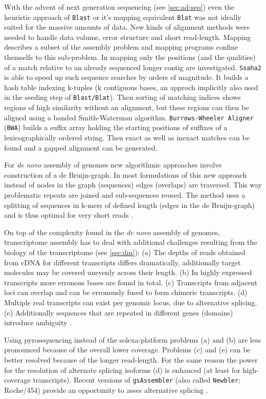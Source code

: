 With the advent of next generation sequencing (see \ref{sec:ad-seq})
even the heuristic approach of \texttt{Blast} or it's mapping
equivalent \texttt{Blat} \cite{pmid11932250} was not ideally suited
for the massive amounts of data. New kinds of alignment methods were
needed to handle data volume, error structure and short read-length.
Mapping describes a subset of the assembly problem and mapping
programs confine themselfs to this sub-problem. In mapping only the
positions (and the qualities) of a match relative to an already
sequenced longer contig are investigated. \texttt{Ssaha2}
\cite{pmid11591649} is able to speed up such sequence searches by
orders of magnitude. It builds a hash table indexing k-tuples (k
contiguous bases, an approch implicitly also used in the seeding step
of \texttt{Blast/Blat}). Then sorting of matching indices shows
regions of high similarity without an alignment, but these regions can
then be aligned using a banded Smith-Waterman
algorithm. \texttt{Burrows-Wheeler Aligner} (\texttt{BWA})
\cite{pmid20080505} builds a suffix array holding the starting
positions of suffixes of a lexicographically ordered string. Then
exact as well as inexact matches can be found and a gapped alignment
can be generated.

For \textit{de novo} assembly of genomes new algorithmic approaches
involve construction of a de Bruijn-graph. In most formulations of
this new approach instead of nodes in the graph (sequences) edges
(overlaps) are traversed. This way problematic repeats are joined and
sub-sequences reused. The method uses a splitting of sequences in
k-mers of defined length (edges in the de Bruijn-graph) and is thus
optimal for very short reads \cite{pmid18349386}.

On top of the complexity found in the \textit{de novo} assembly of
genomes, transcriptome assembly has to deal with additional challenges
resulting from the biology of the transcriptome (see \ref{sec:dm}):
(a) The depths of reads obtained from cDNA for different transcripts
differs dramatically, additionally target molecules may be covered
unevenly across their length. (b) In highly expressed transcripts more
erronous bases are found in total. (c) Transcripts from adjacent loci
can overlap and can be erronously fused to form chimeric
transcripts. (d) Multiple real transcripts can exist per genomic
locus, due to alternative splicing. (e) Additionally sequences that
are repeated in different genes (domains) introduce ambiguity
\cite{pmid21572440}.

Using pyrosequencing instead of the solexa-platform problems (a) and
(b) are less pronounced because of the overall lower
coverage. Problems (c) and (e) can be better resolved because of the
longer read-length. For the same reason the power for the resolution
of alternate splicing isoforms (d) is enhanced (at least for
high-coverage transcripts). Recent versions of \texttt{gsAssembler}
(also called \texttt{Newbler}; Roche/454) provide an opportunity to
asses alternative splicing \cite{pmid21138572}.


